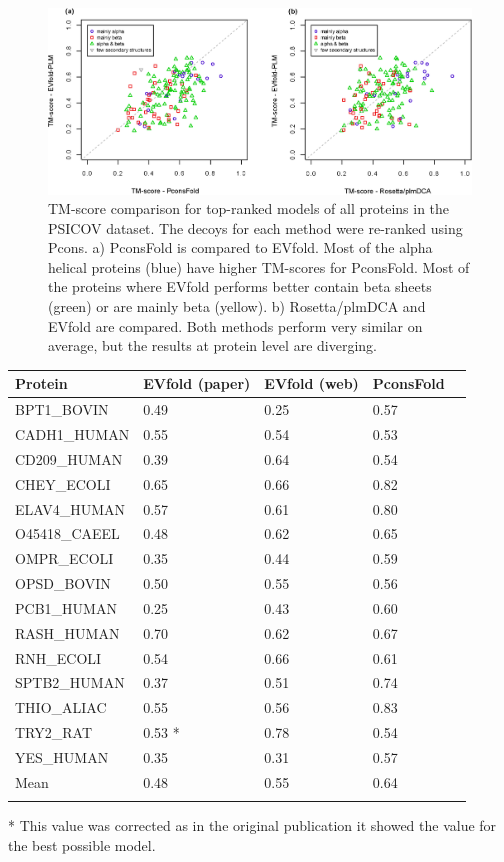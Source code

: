 \documentclass{bioinfo}
\begin{document}
\begin{figure}[!tpb]%
\centerline{\includegraphics[scale=0.7]{figures/vs.eps}}
\caption{TM-score comparison for top-ranked models of all proteins in
  the PSICOV dataset. The decoys for each method were re-ranked using
  Pcons. a) PconsFold is compared to EVfold. Most of the alpha helical
  proteins (blue) have higher TM-scores for PconsFold. Most of the
  proteins where EVfold performs better contain beta sheets (green) or
  are mainly beta (yellow). b) Rosetta/plmDCA and EVfold are
  compared. Both methods perform very similar on average, but the
  results at protein level are diverging.}\label{fig:vs}
\end{figure}

\begin{table}[!t]
{\begin{tabular}{lp{1.5cm}p{1.5cm}p{1.5cm}p{1.5cm}}\toprule
Protein & EVfold (paper) & EVfold (web)   & PconsFold\\\midrule
BPT1\_BOVIN & 0.49 & 0.25    & 0.57 \\
CADH1\_HUMAN & 0.55 & 0.54    & 0.53 \\
CD209\_HUMAN & 0.39 & 0.64    & 0.54 \\
CHEY\_ECOLI & 0.65 & 0.66   & 0.82 \\
ELAV4\_HUMAN & 0.57 & 0.61    & 0.80 \\
O45418\_CAEEL & 0.48 & 0.62   & 0.65 \\
OMPR\_ECOLI & 0.35 & 0.44    & 0.59 \\
OPSD\_BOVIN & 0.50 & 0.55    & 0.56 \\
PCB1\_HUMAN & 0.25 & 0.43    & 0.60 \\
RASH\_HUMAN & 0.70 & 0.62   & 0.67 \\
RNH\_ECOLI & 0.54 & 0.66   & 0.61 \\
SPTB2\_HUMAN & 0.37 & 0.51  & 0.74 \\
THIO\_ALIAC & 0.55 & 0.56   & 0.83 \\
TRY2\_RAT & 0.53 * & 0.78    & 0.54 \\
YES\_HUMAN & 0.35 & 0.31   & 0.57 \\ \midrule
Mean & 0.48 & 0.55   & 0.64 \\ \botrule
\end{tabular}}{* This value was corrected as in the original publication it showed the value for the best possible model.}
\end{table}
\end{document}
